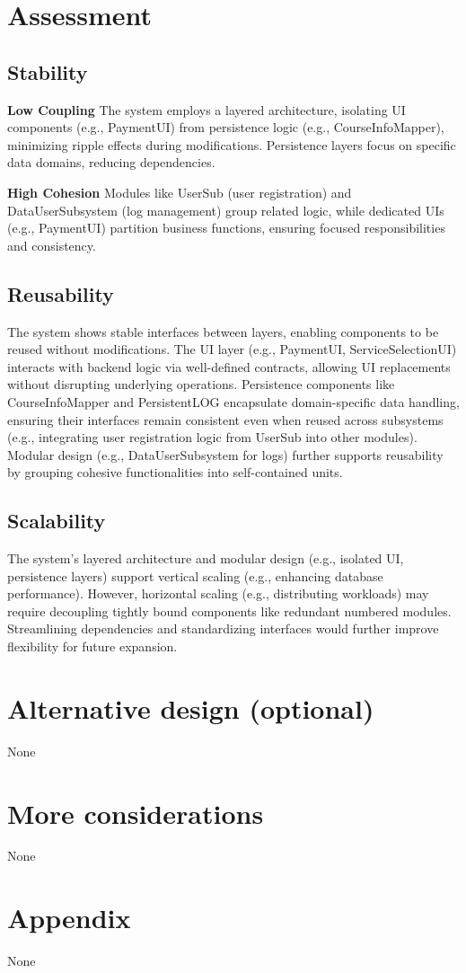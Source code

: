\chapter{Assessment}

\section{Stability}
\textbf{Low Coupling}
The system employs a layered architecture, isolating UI components (e.g., PaymentUI) from persistence logic (e.g., CourseInfoMapper), minimizing ripple effects during modifications. Persistence layers focus on specific data domains, reducing dependencies.  

\textbf{High Cohesion }
Modules like UserSub (user registration) and DataUserSubsystem (log management) group related logic, while dedicated UIs (e.g., PaymentUI) partition business functions, ensuring focused responsibilities and consistency. 

\section{Reusability}
The system shows stable interfaces between layers, enabling components to be reused without modifications. The UI layer (e.g., PaymentUI, ServiceSelectionUI) interacts with backend logic via well-defined contracts, allowing UI replacements without disrupting underlying operations. Persistence components like CourseInfoMapper and PersistentLOG encapsulate domain-specific data handling, ensuring their interfaces remain consistent even when reused across subsystems (e.g., integrating user registration logic from UserSub into other modules). Modular design (e.g., DataUserSubsystem for logs) further supports reusability by grouping cohesive functionalities into self-contained units.

\section{Scalability} 
The system’s layered architecture and modular design (e.g., isolated UI, persistence layers) support vertical scaling (e.g., enhancing database performance). However, horizontal scaling (e.g., distributing workloads) may require decoupling tightly bound components like redundant numbered modules. Streamlining dependencies and standardizing interfaces would further improve flexibility for future expansion.


\chapter{Alternative design (optional)}
None

\chapter{More considerations}
None

\chapter{Appendix}
None

 
\nocite{*}
\printbibliography[heading=bibintoc]

